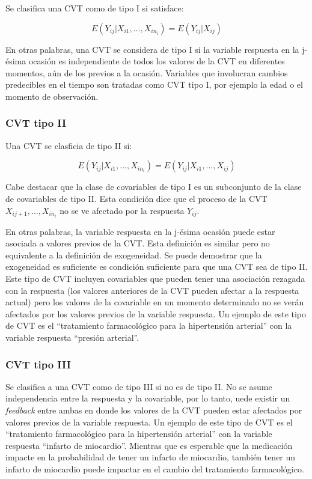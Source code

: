 \documentclass[spanish]{article}
\numberwithin{figure}{subsection}
\numberwithin{equation}{subsection}
\numberwithin{table}{subsection}
\begin{document}
Se clasifica una CVT como de tipo I si satisface:

\begin{equation}
	\label{CVT tipo I}
	E(Y_{ij}|X_{i1}, ..., X_{in_i}) = E(Y_{ij}|X_{ij})
\end{equation}

En otras palabras, una CVT se considera de tipo I si la variable respuesta en
la j-ésima ocasión es independiente de todos los valores de la CVT en
diferentes momentos, aún de los previos a la ocasión. Variables que involucran
cambios predecibles en el tiempo son tratadas como CVT tipo I, por ejemplo la
edad o el momento de observación.

\subsubsection{CVT tipo II}

Una CVT se clasficia de tipo II si:

\begin{equation}
	\label{CVT tipo II}
	E(Y_{ij}|X_{i1}, ..., X_{in_i}) = E(Y_{ij}|X_{i1}, ..., X_{ij})
\end{equation}

Cabe destacar que la clase de covariables de tipo I es un subconjunto de la
clase de covariables de tipo II. Esta condición dice que el proceso de la CVT
$X_{ij+1}, ..., X_{in_i}$ no se ve afectado por la respuesta $Y_{ij}$.

En otras palabras, la variable respuesta en la j-ésima ocasión puede estar
asociada a valores previos de la CVT. Esta definición es similar pero no
equivalente a la definición de exogeneidad. Se puede demostrar que la
exogeneidad es suficiente es condición suficiente para que una CVT sea de tipo
II. Este tipo de CVT incluyen covariables que pueden tener una asociación
rezagada con la respuesta (los valores anteriores de la CVT pueden afectar a la
respuesta actual) pero los valores de la covariable en un momento determinado
no se verán afectados por los valores previos de la variable respuesta. Un
ejemplo de este tipo de CVT es el ``tratamiento farmacológico para la
hipertensión arterial'' con la variable respuesta ``presión arterial''.

\subsubsection{CVT tipo III}

Se clasifica a una CVT como de tipo III si no es de tipo II. No se asume
independencia entre la respuesta y la covariable, por lo tanto, uede existir un
\textit{feedback} entre ambas en donde los valores de la CVT pueden estar
afectados por valores previos de la variable respuesta. Un ejemplo de este tipo
de CVT es el ``tratamiento farmacológico para la hipertensión arterial'' con la
variable respuesta ``infarto de miocardio''. Mientras que es esperable que la
medicación impacte en la probabilidad de tener un infarto de miocardio, también
tener un infarto de miocardio puede impactar en el cambio del tratamiento
farmacológico.
\end{document}
